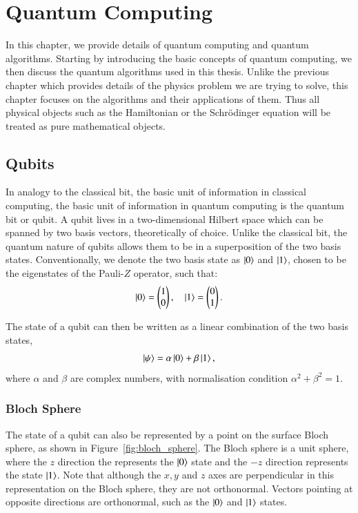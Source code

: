 \chapter{Quantum Computing}
\label{ch:qc}
In this chapter, we provide details of quantum computing and quantum algorithms. Starting by introducing the basic concepts of quantum computing, we then discuss the quantum algorithms used in this thesis. Unlike the previous chapter which provides details of the physics problem we are trying to solve, this chapter focuses on the algorithms and their applications of them. Thus all physical objects such as the Hamiltonian or the Schr{\"o}dinger equation will be treated as pure mathematical objects. 

\section{Qubits}
In analogy to the classical bit, the basic unit of information in classical computing, the basic unit of information in quantum computing is the quantum bit or qubit. A qubit lives in a two-dimensional Hilbert space which can be spanned by two basis vectors, theoretically of choice. Unlike the classical bit, the quantum nature of qubits allows them to be in a superposition of the two basis states. Conventionally, we denote the two basis state as $ \ket{0} $ and $ \ket{1} $, chosen to be the eigenstates of the Pauli-$Z$ operator, such that:
\begin{equation}
	\ket{0} = \begin{pmatrix}
		1 \\
		0
	\end{pmatrix}, \quad
	\ket{1} = \begin{pmatrix}
		0 \\
		1
	\end{pmatrix}.
\end{equation}

The state of a qubit can then be written as a linear combination of the two basis states,
\begin{equation}
	\ket{\psi} = \alpha \ket{0} + \beta \ket{1},
\end{equation}
where $\alpha$ and $\beta$ are complex numbers, with normalisation condition $\alpha^2 + \beta^2 = 1$. 

\subsection{Bloch Sphere}
The state of a qubit can also be represented by a point on the surface Bloch sphere, as shown in Figure~\ref{fig:bloch_sphere}. The Bloch sphere is a unit sphere, where the $ z $ direction the represents the $\ket{0}$ state and the $-z$ direction represents the state $\ket{1}$. Note that although the $x,y$ and $z$ axes are perpendicular in this representation on the Bloch sphere, they are not orthonormal. Vectors pointing at opposite directions are orthonormal, such as the $\ket{0}$ and $\ket{1}$ states.

